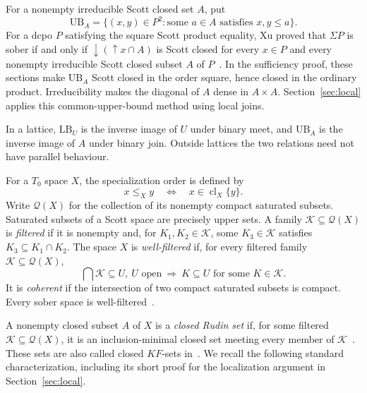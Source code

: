 \documentclass[10pt,a4paper]{article}
\theoremstyle{definition}
\begin{document}
For a nonempty irreducible Scott closed set $A$, put
\[
 \mathrm{UB}_A
   =\{(x,y)\in P^2:\text{some }a\in A\text{ satisfies }x,y\leq a\}.
\]
For a dcpo $P$ satisfying the square Scott product equality, Xu proved that $\Sigma P$ is sober if and only if ${\downarrow}({\uparrow}x\cap A)$ is Scott closed for every $x\in P$ and every nonempty irreducible Scott closed subset $A$ of $P$~\cite[Proposition~5.2]{Xu}. In the sufficiency proof, these sections make $\mathrm{UB}_A$ Scott closed in the order square, hence closed in the ordinary product. Irreducibility makes the diagonal of $A$ dense in $A\times A$. Section~\ref{sec:local} applies this common-upper-bound method using local joins.

In a lattice, $\mathrm{LB}_U$ is the inverse image of $U$ under binary meet, and $\mathrm{UB}_A$ is the inverse image of $A$ under binary join. Outside lattices the two relations need not have parallel behaviour.


For a $T_0$ space $X$, the specialization order is defined by
\[
 x\leq_X y\quad\Longleftrightarrow\quad x\in\operatorname{cl}_X\{y\}.
\]
Write $\mathcal Q(X)$ for the collection of its nonempty compact saturated subsets. Saturated subsets of a Scott space are precisely upper sets. A family $\mathcal K\subseteq\mathcal Q(X)$ is \emph{filtered} if it is nonempty and, for $K_1,K_2\in\mathcal K$, some $K_3\in\mathcal K$ satisfies $K_3\subseteq K_1\cap K_2$. The space $X$ is \emph{well-filtered} if, for every filtered family $\mathcal K\subseteq\mathcal Q(X)$,
\[
 \bigcap\mathcal K\subseteq U,~ U\text{ open}
 ~\Longrightarrow~
 K\subseteq U\text{ for some }K\in\mathcal K.
\]
It is \emph{coherent} if the intersection of two compact saturated subsets is compact. Every sober space is well-filtered~\cite[Theorem~II-1.21]{GHK}.

A nonempty closed subset $A$ of $X$ is a \emph{closed Rudin set} if, for some filtered $\mathcal K\subseteq\mathcal Q(X)$, it is an inclusion-minimal closed set meeting every member of $\mathcal K$~\cite{XZ}. These sets are also called closed $KF$-sets in~\cite{MLZ}. We recall the following standard characterization, including its short proof for the localization argument in Section~\ref{sec:local}.
\end{document}
